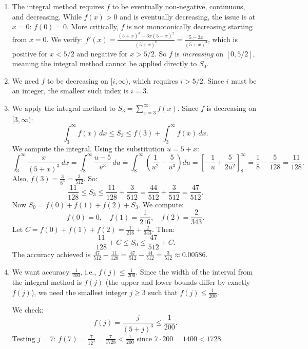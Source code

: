 \documentclass[11pt]{article}
\begin{document}
\begin{enumerate}[label=\textbf{(\alph*)}]

\item The integral method requires $f$ to be eventually non-negative, continuous,
and decreasing. While $f(x) > 0$ and is eventually decreasing, the issue is at
$x = 0$: $f(0) = 0$. More critically, $f$ is not monotonically decreasing starting
from $x = 0$. We verify: $f'(x) = \frac{(5+x)^3 - 3x(5+x)^2}{(5+x)^6} =
\frac{5-2x}{(5+x)^4}$, which is positive for $x < 5/2$ and negative for $x > 5/2$.
So $f$ is \textit{increasing} on $[0, 5/2]$, meaning the integral method cannot be
applied directly to $S_0$.

\item We need $f$ to be decreasing on $[i, \infty)$, which requires $i > 5/2$.
Since $i$ must be an integer, the smallest such index is $\boxed{i = 3}$.

\item We apply the integral method to $S_3 = \sum_{x=3}^{\infty} f(x)$. Since $f$
is decreasing on $[3, \infty)$:
\[
    \int_3^{\infty} f(x)\,dx \leq S_3 \leq f(3) + \int_3^{\infty} f(x)\,dx.
\]
We compute the integral. Using the substitution $u = 5 + x$:
\[
    \int_3^{\infty} \frac{x}{(5+x)^3}\,dx = \int_8^{\infty} \frac{u-5}{u^3}\,du =
    \int_8^{\infty} \left(\frac{1}{u^2} - \frac{5}{u^3}\right)du =
    \left[-\frac{1}{u} + \frac{5}{2u^2}\right]_8^{\infty} = \frac{1}{8} -
    \frac{5}{128} = \frac{11}{128}.
\]
Also, $f(3) = \frac{3}{8^3} = \frac{3}{512}$. So:
\[
    \frac{11}{128} \leq S_3 \leq \frac{11}{128} + \frac{3}{512} =
    \frac{44}{512} + \frac{3}{512} = \frac{47}{512}.
\]
Now $S_0 = f(0) + f(1) + f(2) + S_3$. We compute:
\[
    f(0) = 0, \quad f(1) = \frac{1}{216}, \quad f(2) = \frac{2}{343}.
\]
Let $C = f(0) + f(1) + f(2) = \frac{1}{216} + \frac{2}{343}$. Then:
\[
    \frac{11}{128} + C \leq S_0 \leq \frac{47}{512} + C.
\]
The accuracy achieved is $\frac{47}{512} - \frac{11}{128} = \frac{47}{512} -
\frac{44}{512} = \frac{3}{512} \approx 0.00586$.

\item We want accuracy $\frac{1}{200}$, i.e., $f(j) \leq \frac{1}{200}$. Since the
width of the interval from the integral method is $f(j)$ (the upper and lower bounds
differ by exactly $f(j)$), we need the smallest integer $j \geq 3$ such that
$f(j) \leq \frac{1}{200}$.

We check:
\[
    f(j) = \frac{j}{(5+j)^3} \leq \frac{1}{200}.
\]
Testing $j = 7$: $f(7) = \frac{7}{12^3} = \frac{7}{1728} < \frac{1}{200}$ since
$7 \cdot 200 = 1400 < 1728$. \checkmark


\end{enumerate}
\end{document}
